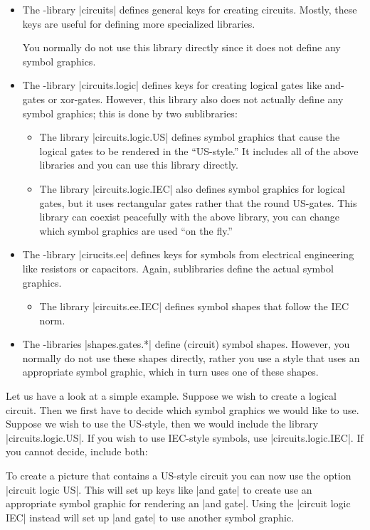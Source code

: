 \begin{itemize}
\item The \tikzname-library |circuits| defines general keys for
  creating circuits. Mostly, these keys are useful for defining more
  specialized libraries.

  You normally do not use this library directly since it does not
  define any symbol graphics.
\item The \tikzname-library |circuits.logic| defines keys for creating
  logical gates like and-gates or xor-gates. However, this library
  also does not actually define any symbol graphics; this is done by
  two sublibraries:
  \begin{itemize}
  \item The library |circuits.logic.US| defines symbol graphics that
    cause the logical gates to be rendered in the ``US-style.'' It
    includes all of the above libraries and you can use this library
    directly.
  \item The library |circuits.logic.IEC| also defines symbol graphics
    for logical gates, but it uses rectangular gates rather that the
    round US-gates. This library can coexist peacefully with the above
    library, you can change which symbol graphics are used ``on the
    fly.''
  \end{itemize}
\item The \tikzname-library |cirucits.ee| defines keys for symbols
  from electrical engineering like resistors or capacitors. Again,
  sublibraries define the actual symbol graphics.
  \begin{itemize}
  \item The library |circuits.ee.IEC| defines symbol shapes that
    follow the IEC norm.
  \end{itemize}
\item The \pgfname-libraries |shapes.gates.*| define (circuit) symbol
  shapes. However, you normally do not use these shapes directly,
  rather you use a style that uses an appropriate symbol graphic,
  which in turn uses one of these shapes.
\end{itemize}

Let us have a look at a simple example. Suppose we wish to create a
logical circuit. Then we first have to decide which symbol graphics we
would like to use. Suppose we wish to use the US-style, then we would
include the library |circuits.logic.US|. If you wish to use IEC-style
symbols, use |circuits.logic.IEC|. If you cannot decide, include both:
\begin{codeexample}
\usetikzlibrary{circuits.logic.US,circuits.logic.IEC}
\end{codeexample}
To create a picture that contains a US-style circuit you can now use
the option |circuit logic US|. This will set up keys like |and gate| to
create use an appropriate symbol graphic for rendering an |and gate|. Using the |circuit logic IEC| instead will set up |and gate| to
use another symbol graphic.

